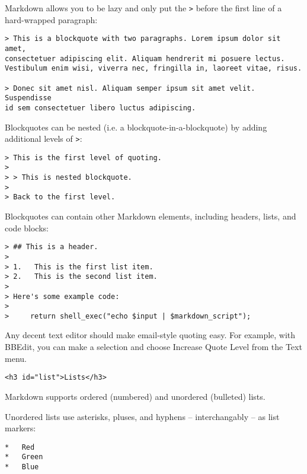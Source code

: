 Markdown allows you to be lazy and only put the \texttt{>} before the first
line of a hard-wrapped paragraph:

\begin{lstlisting}
> This is a blockquote with two paragraphs. Lorem ipsum dolor sit amet,
consectetuer adipiscing elit. Aliquam hendrerit mi posuere lectus.
Vestibulum enim wisi, viverra nec, fringilla in, laoreet vitae, risus.

> Donec sit amet nisl. Aliquam semper ipsum sit amet velit. Suspendisse
id sem consectetuer libero luctus adipiscing.
\end{lstlisting}




Blockquotes can be nested (i.e. a blockquote-in-a-blockquote) by
adding additional levels of \texttt{>}:

\begin{lstlisting}
> This is the first level of quoting.
>
> > This is nested blockquote.
>
> Back to the first level.
\end{lstlisting}




Blockquotes can contain other Markdown elements, including headers, lists,
and code blocks:

\begin{lstlisting}
> ## This is a header.
> 
> 1.   This is the first list item.
> 2.   This is the second list item.
> 
> Here's some example code:
> 
>     return shell_exec("echo $input | $markdown_script");
\end{lstlisting}




Any decent text editor should make email-style quoting easy. For
example, with BBEdit, you can make a selection and choose Increase
Quote Level from the Text menu.

\begin{lstlisting}<h3 id="list">Lists</h3>\end{lstlisting}




Markdown supports ordered (numbered) and unordered (bulleted) lists.



Unordered lists use asterisks, pluses, and hyphens -- interchangably
-- as list markers:

\begin{lstlisting}
*   Red
*   Green
*   Blue
\end{lstlisting}




